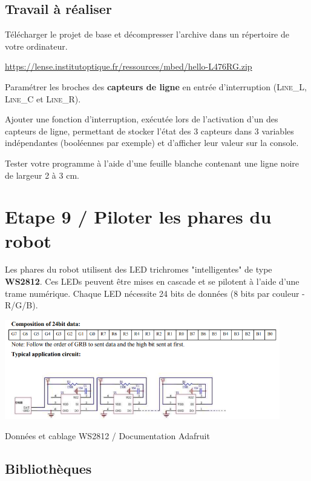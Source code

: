 \documentclass[a4paper,11pt,titlepage]{article} %
\begin{document}
\subsection{Travail à réaliser}

\Manip Télécharger le projet de base et décompresser l'archive dans un répertoire de votre ordinateur.

\href{https://lense.institutoptique.fr/ressources/mbed/hello-L476RG.zip}{https://lense.institutoptique.fr/ressources/mbed/hello-L476RG.zip}

\Manip Paramétrer les broches des \textbf{capteurs de ligne} en entrée d'interruption (\textsc{Line\_L}, \textsc{Line\_C} et \textsc{Line\_R}).

\Manip Ajouter une fonction d'interruption, exécutée lors de l'activation d'un des capteurs de ligne, permettant de stocker l'état des 3 capteurs dans 3 variables indépendantes (booléennes par exemple) et d'afficher leur valeur sur la console.

\Manip Tester votre programme à l'aide d'une feuille blanche contenant une ligne noire de largeur 2 à 3 cm.

\newpage
\section{Etape 9 / Piloter les phares du robot}

Les phares du robot utilisent des LED trichromes "intelligentes" de type \textbf{WS2812}. Ces LEDs peuvent être mises en cascade et se pilotent à l'aide d'une trame numérique. Chaque LED nécessite 24 bits de données (8 bits par couleur - R/G/B).

\begin{center}
	\includegraphics[width=0.9\textwidth]{images/W2812.png}
	
	Données et cablage WS2812 / Documentation Adafruit
\end{center}


\subsection{Bibliothèques }
\end{document}
